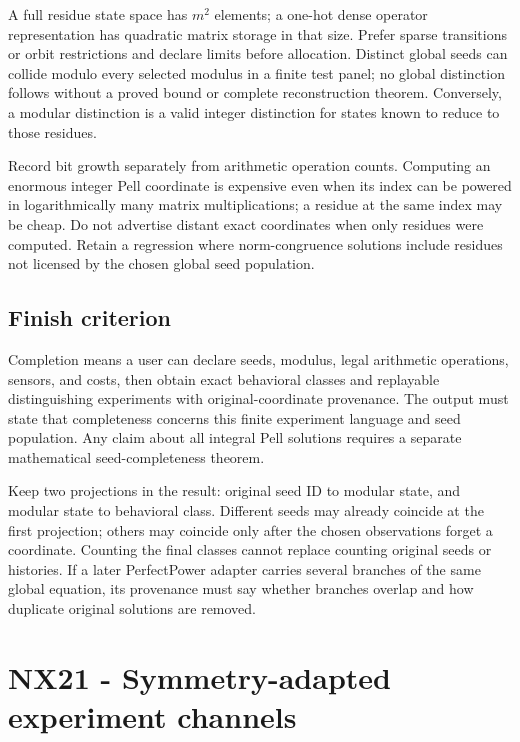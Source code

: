 \documentclass[
  11pt,
  a4paper,
]{report}
\begin{document}
A full residue state space has \(m^2\) elements; a one-hot dense
operator representation has quadratic matrix storage in that size.
Prefer sparse transitions or orbit restrictions and declare limits
before allocation. Distinct global seeds can collide modulo every
selected modulus in a finite test panel; no global distinction follows
without a proved bound or complete reconstruction theorem. Conversely, a
modular distinction is a valid integer distinction for states known to
reduce to those residues.

Record bit growth separately from arithmetic operation counts. Computing
an enormous integer Pell coordinate is expensive even when its index can
be powered in logarithmically many matrix multiplications; a residue at
the same index may be cheap. Do not advertise distant exact coordinates
when only residues were computed. Retain a regression where
norm-congruence solutions include residues not licensed by the chosen
global seed population.

\hypertarget{finish-criterion}{%
\section{Finish criterion}\label{finish-criterion}}

Completion means a user can declare seeds, modulus, legal arithmetic
operations, sensors, and costs, then obtain exact behavioral classes and
replayable distinguishing experiments with original-coordinate
provenance. The output must state that completeness concerns this finite
experiment language and seed population. Any claim about all integral
Pell solutions requires a separate mathematical seed-completeness
theorem.

Keep two projections in the result: original seed ID to modular state,
and modular state to behavioral class. Different seeds may already
coincide at the first projection; others may coincide only after the
chosen observations forget a coordinate. Counting the final classes
cannot replace counting original seeds or histories. If a later
PerfectPower adapter carries several branches of the same global
equation, its provenance must say whether branches overlap and how
duplicate original solutions are removed.

\hypertarget{nx21---symmetry-adapted-experiment-channels}{%
\chapter{NX21 - Symmetry-adapted experiment
channels}\label{nx21---symmetry-adapted-experiment-channels}}
\end{document}

